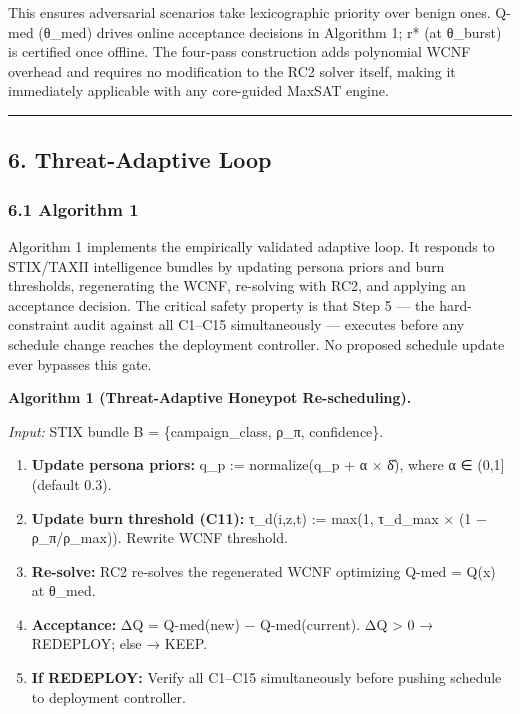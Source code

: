 \documentclass[
  11pt,
]{article}
\providecommand{\tightlist}{%
  \setlength{\itemsep}{0pt}\setlength{\parskip}{0pt}}
\begin{document}
This ensures adversarial scenarios take lexicographic priority over
benign ones. Q-med (θ\_med) drives online acceptance decisions in
Algorithm 1; r* (at θ\_burst) is certified once offline. The four-pass
construction adds polynomial WCNF overhead and requires no modification
to the RC2 solver itself, making it immediately applicable with any
core-guided MaxSAT engine.

\begin{center}\rule{0.5\linewidth}{0.5pt}\end{center}

\hypertarget{threat-adaptive-loop}{%
\subsection{6. Threat-Adaptive Loop}\label{threat-adaptive-loop}}

\hypertarget{algorithm-1}{%
\subsubsection{6.1 Algorithm 1}\label{algorithm-1}}

Algorithm 1 implements the empirically validated adaptive loop. It
responds to STIX/TAXII intelligence bundles by updating persona priors
and burn thresholds, regenerating the WCNF, re-solving with RC2, and
applying an acceptance decision. The critical safety property is that
Step 5 --- the hard-constraint audit against all C1--C15 simultaneously
--- executes before any schedule change reaches the deployment
controller. No proposed schedule update ever bypasses this gate.

\textbf{Algorithm 1 (Threat-Adaptive Honeypot Re-scheduling).}

\emph{Input:} STIX bundle B = \{campaign\_class, ρ\_π, confidence\}.

\begin{enumerate}
\def\labelenumi{\arabic{enumi}.}
\tightlist
\item
  \textbf{Update persona priors:} q\_p := normalize(q\_p + α × δ̂), where
  α ∈ (0,1{]} (default 0.3).
\item
  \textbf{Update burn threshold (C11):} τ\_d(i,z,t) := max(1, τ\_d\_max
  × (1 − ρ\_π/ρ\_max)). Rewrite WCNF threshold.
\item
  \textbf{Re-solve:} RC2 re-solves the regenerated WCNF optimizing Q-med
  = Q(x) at θ\_med.
\item
  \textbf{Acceptance:} ΔQ = Q-med(new) − Q-med(current). ΔQ
  \textgreater{} 0 → REDEPLOY; else → KEEP.
\item
  \textbf{If REDEPLOY:} Verify all C1--C15 simultaneously before pushing
  schedule to deployment controller.
\end{enumerate}
\end{document}
